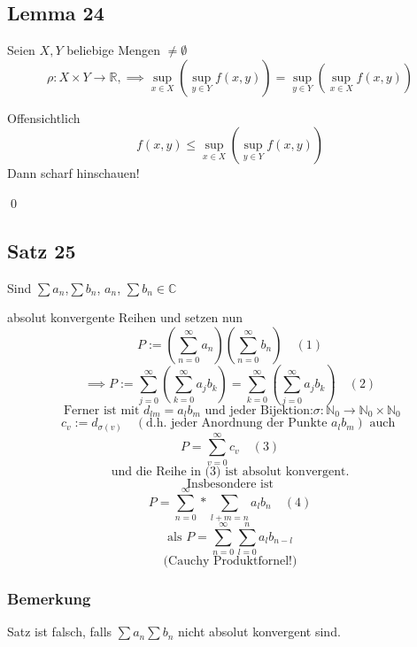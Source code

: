 \documentclass[fleqn]{scrbook}
\newcommand{\R}{\mathbb{R}}
\newcommand{\N}{\mathbb{N}}
\renewenvironment{proof}{{\bfseries Beweis }}{\qed}
\begin{document}
\subsection{Lemma 24}

Seien $X,Y$ beliebige Mengen $\neq \emptyset$
\[\rho:X \times Y \to \R, \implies \sup_{x \in X} \left( \sup_{y \in Y} f(x,y) \right) = \sup_{y \in Y} \left( \sup_{x \in X} f(x,y) \right) \]

\begin{proof}

Offensichtlich
\[f(x,y) \leq \sup_{x \in X} \left( \sup_{y \in Y} f(x,y) \right)\]
Dann scharf hinschauen! %

\end{proof}

\subsection{Satz 25}

Sind $\sum a_n$,$\sum b_n$, \quad $a_n$, $\sum b_n \in \mathbb{C}$

absolut konvergente Reihen und setzen nun
\[\boxed{P:= \left( \sum_{n=0}^\infty a_n \right)\left( \sum_{n=0}^\infty b_n \right)} \quad (1)\]
\[\implies \boxed{P := \sum_{j=0}^\infty \left( \sum_{k=0}^\infty  a_j b_k \right) = \sum_{k=0}^\infty \left( \sum_{j=0}^\infty  a_j b_k \right)} \quad (2)\]
\[\text{ Ferner ist mit } d_{lm} = a_l b_m \text{ und jeder Bijektion:} \sigma:\N_0 \to \N_0 \times \N_0 \]
\[c_v := d_{\sigma(v)} \quad (\text{d.h. jeder Anordnung der Punkte } a_l b_m) \text{ auch }\]
\[\boxed{P= \sum_{v=0}^\infty c_v} \quad (3)\]
\[\text{und die Reihe in (3) ist absolut konvergent.}\]
\[\text{Insbesondere ist}\]
\[\boxed{P=\sum_{n=0}^\infty * \sum_{l+m=n} a_l b_n } \quad (4)\]
\[\text{als } P=\sum_{n=0}^\infty \sum_{l=0}^n a_l b_{n-l}\]
\[\text{(Cauchy Produktfornel!)}\]

\subsubsection{Bemerkung}

Satz ist falsch, falls $\sum a_n \sum b_n$ nicht absolut konvergent sind.
\end{document}
